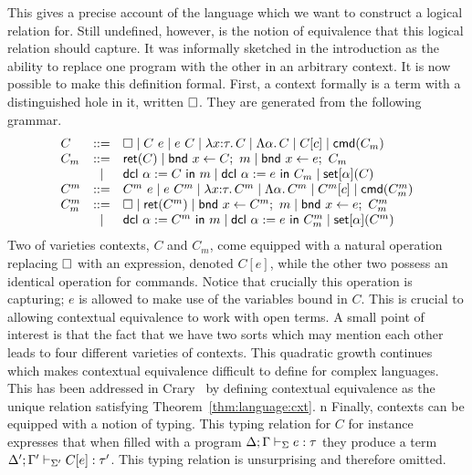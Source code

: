 This gives a precise account of the language which we want to
construct a logical relation for. Still undefined, however, is the
notion of equivalence that this logical relation should capture. It
was informally sketched in the introduction as the ability to replace
one program with the other in an arbitrary context. It is now possible
to make this definition formal. First, a context formally is a term
with a distinguished hole in it, written $\square$. They are generated
from the following grammar.
\[
  \begin{array}{lcl}
    C &::=& \square \mid C\ e \mid e\ C \mid \lambda x {:} \tau.\, C \mid
            \Lambda \alpha.\, C \mid C[c] \mid \mathsf{cmd}(C_m)\\
    C_m &::=& \mathsf{ret}(C) \mid \mathsf{bnd}\ x \gets C;\ m \mid \mathsf{bnd}\ x \gets e;\ C_m\\
      & \mid & \mathsf{dcl}\ \alpha := C\ \mathsf{in}\ m \mid \mathsf{dcl}\ \alpha := e\ \mathsf{in}\ C_m \mid \mathsf{set}[\alpha](C)\\
    C^m &::=& C^m\ e \mid e\ C^m \mid \lambda x {:} \tau.\, C^m \mid
    \Lambda \alpha.\, C^m \mid C^m[c] \mid \mathsf{cmd}(C_m^m)\\
    C_m^m &::=& \square \mid \mathsf{ret}(C^m) \mid \mathsf{bnd}\ x \gets C^m;\ m \mid \mathsf{bnd}\ x \gets e;\ C_m^m\\
 & \mid & \mathsf{dcl}\ \alpha := C^m\ \mathsf{in}\ m \mid \mathsf{dcl}\ \alpha := e\ \mathsf{in}\ C_m^m \mid \mathsf{set}[\alpha](C^m)\\
  \end{array}
\]
Two of varieties contexts, $C$ and $C_m$, come equipped with a natural
operation replacing $\square$ with an expression, denoted $C[e]$, while
the other two possess an identical operation for commands. Notice that
crucially this operation is capturing; $e$ is allowed to make use of
the variables bound in $C$. This is crucial to allowing contextual
equivalence to work with open terms. A small point of interest is that
the fact that we have two sorts which may mention each other leads to
four different varieties of contexts. This quadratic growth continues
which makes contextual equivalence difficult to define for complex
languages. This has been addressed in Crary~\citep{Crary:17} by
defining contextual equivalence as the unique relation satisfying
Theorem~\ref{thm:language:cxt}.
n
Finally, contexts can be equipped with a notion of typing. This typing
relation for $C$ for instance expresses that when filled with
a program $\Delta; \Gamma \vdash_{\Sigma} e \mathrel{:} \tau$ they produce a
term $\Delta'; \Gamma' \vdash_{\Sigma'} C[e] \mathrel{:} \tau'$. This typing
relation is unsurprising and therefore omitted.

